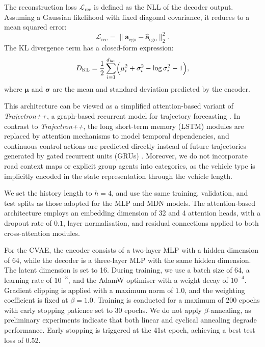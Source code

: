 \documentclass[journal]{IEEEtran}
\begin{document}
The reconstruction loss $\mathcal{L}_{\text{rec}}$ is defined as the NLL of the decoder output. Assuming a Gaussian likelihood with fixed diagonal covariance, it reduces to a mean squared error:
\begin{equation}
    \mathcal{L}_{\text{rec}}
    =
    \lVert
    \mathbf{a}_{\text{ego}} - \hat{\mathbf{a}}_{\text{ego}}
    \rVert_2^2.
\end{equation}
The KL divergence term has a closed-form expression:
\begin{equation}
    D_{\text{KL}}
    =
    \frac{1}{2}
    \sum_{i=1}^{d_\text{lat}}
    \Bigl(
    \mu_i^2 + \sigma_i^2 - \log \sigma_i^2 - 1
    \Bigr),
\end{equation}
where $\boldsymbol{\mu}$ and $\boldsymbol{\sigma}$ are the mean and standard deviation predicted by the encoder.

This architecture can be viewed as a simplified attention-based variant of \textit{Trajectron++}, a graph-based recurrent model for trajectory forecasting \cite{salzmann_TrajectronDynamicallyFeasibleTrajectory_2020a}. In contrast to \textit{Trajectron++}, the long short-term memory (LSTM) modules \cite{hochreiter_LongShortTermMemory_1997} are replaced by attention mechanisms to model temporal dependencies, and continuous control actions are predicted directly instead of future trajectories generated by gated recurrent units (GRUs) \cite{cho_LearningPhraseRepresentations_2014}. Moreover, we do not incorporate road context maps or explicit group agents into categories, as the vehicle type is implicitly encoded in the state representation through the vehicle length.

We set the history length to $h=4$, and use the same training, validation, and test splits as those adopted for the MLP and MDN models. The attention-based architecture employs an embedding dimension of 32 and 4 attention heads, with a dropout rate of $0.1$, layer normalisation, and residual connections applied to both cross-attention modules.

For the CVAE, the encoder consists of a two-layer MLP with a hidden dimension of 64, while the decoder is a three-layer MLP with the same hidden dimension. The latent dimension is set to 16. During training, we use a batch size of 64, a learning rate of $10^{-3}$, and the AdamW optimiser with a weight decay of $10^{-4}$. Gradient clipping is applied with a maximum norm of $1.0$, and the weighting coefficient is fixed at $\beta=1.0$. Training is conducted for a maximum of 200 epochs with early stopping patience set to 30 epochs. We do not apply $\beta$-annealing, as preliminary experiments indicate that both linear and cyclical annealing degrade performance. Early stopping is triggered at the 41st epoch, achieving a best test loss of 0.52.
\end{document}
